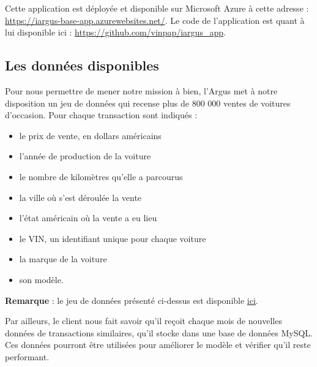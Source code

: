 \documentclass[french]{article}
\begin{document}
    Cette application est déployée et disponible sur Microsoft Azure à cette adresse : \href{https://iargus-base-app.azurewebsites.net/}{https://iargus-base-app.azurewebsites.net/}. Le code de l'application est quant à lui disponible ici : \href{https://github.com/vinpap/iargus_app}{https://github.com/vinpap/iargus\_app}.

    \subsection{Les données disponibles}
    Pour nous permettre de mener notre mission à bien, l'Argus met à notre disposition un jeu de données qui recense plus de 800 000 ventes de voitures d'occasion. Pour chaque transaction sont indiqués :
    \begin{itemize}
        \item le prix de vente, en dollars américains
        \item l'année de production de la voiture
        \item le nombre de kilomètres qu'elle a parcourus
        \item la ville où s'est déroulée la vente
        \item l'état américain où la vente a eu lieu
        \item le VIN, un identifiant unique pour chaque voiture
        \item la marque de la voiture
        \item son modèle.
    \end{itemize}
    \textbf{Remarque} : le jeu de données présenté ci-dessus est disponible \href{https://www.kaggle.com/datasets/harikrishnareddyb/used-car-price-predictions/data}{ici}.
    
    Par ailleurs, le client nous fait savoir qu'il reçoit chaque mois de nouvelles données de transactions similaires, qu'il stocke dans une base de données MySQL. Ces données pourront être utilisées pour améliorer le modèle et vérifier qu'il reste performant.
\end{document}
